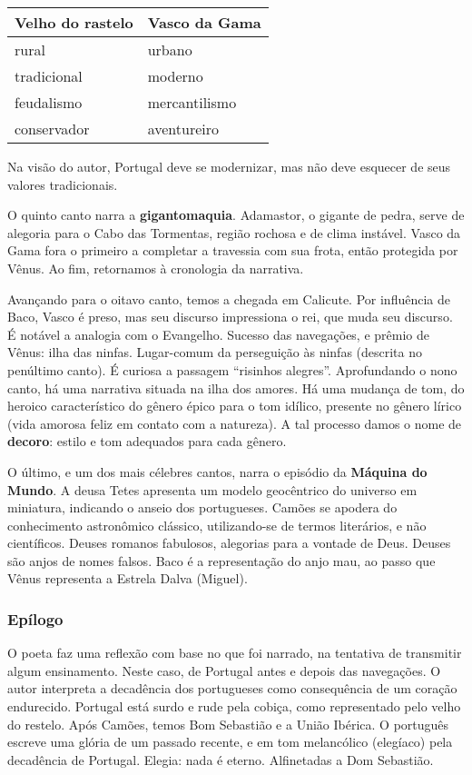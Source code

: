 \begin{table}[h]
\centering
\begin{tabular}{l l}
\toprule
\textbf{Velho do rastelo} & \textbf{Vasco da Gama} \\
\midrule
rural & urbano \\
tradicional & moderno \\
feudalismo & mercantilismo \\
conservador & aventureiro \\
\bottomrule
\end{tabular}
\end{table}
    
Na visão do autor, Portugal deve se modernizar, mas não deve esquecer de seus valores tradicionais. 

O quinto canto narra a \textbf{gigantomaquia}. Adamastor, o gigante de pedra, serve de alegoria para o Cabo das Tormentas, região rochosa e de clima instável. Vasco da Gama fora o primeiro a completar a travessia com sua frota, então protegida por Vênus. Ao fim, retornamos à cronologia da narrativa. 

Avançando para o oitavo canto, temos a chegada em Calicute. Por influência de Baco, Vasco é preso, mas seu discurso impressiona o rei, que muda seu discurso. É notável a analogia com o Evangelho. Sucesso das navegações, e prêmio de Vênus: ilha das ninfas. Lugar-comum da perseguição às ninfas (descrita no penúltimo canto). É curiosa a passagem ``risinhos alegres''. Aprofundando o nono canto, há uma narrativa situada na ilha dos amores. Há uma mudança de tom, do heroico característico do gênero épico para o tom idílico, presente no gênero lírico (vida amorosa feliz em contato com a natureza). A tal processo damos o nome de \textbf{decoro}: estilo e tom adequados para cada gênero. 

O último, e um dos mais célebres cantos, narra o episódio da \textbf{Máquina do Mundo}. A deusa Tetes apresenta um modelo geocêntrico do universo em miniatura, indicando o anseio dos portugueses. Camões se apodera do conhecimento astronômico clássico, utilizando-se de termos literários, e não científicos. Deuses romanos fabulosos, alegorias para a vontade de Deus. Deuses são anjos de nomes falsos. Baco é a representação do anjo mau, ao passo que Vênus representa a Estrela Dalva (Miguel).

\subsubsection{Epílogo}

O poeta faz uma reflexão com base no que foi narrado, na tentativa de transmitir algum ensinamento. Neste caso, de Portugal antes e depois das navegações. O autor interpreta a decadência dos portugueses como consequência de um coração endurecido. Portugal está surdo e rude pela cobiça, como representado pelo velho do restelo. Após Camões, temos Bom Sebastião e a União Ibérica. O português escreve uma glória de um passado recente, e em tom melancólico (elegíaco) pela decadência de Portugal. Elegia: nada é eterno. Alfinetadas a Dom Sebastião.